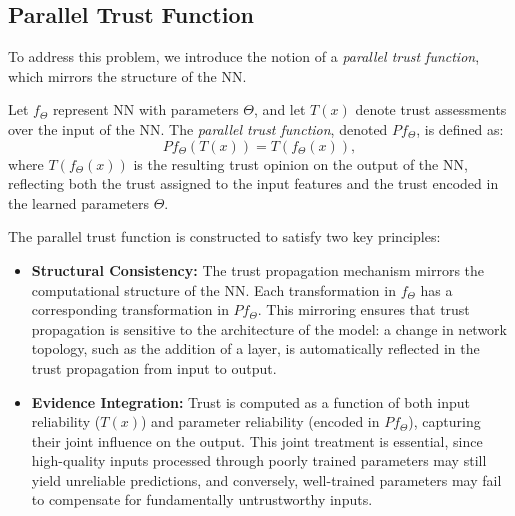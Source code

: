 \subsection{Parallel Trust Function}
To address this problem, we introduce the notion of a \emph{parallel trust function}, which mirrors the structure of the \ac{NN}.

\begin{definition}
Let $f_\Theta$ represent \ac{NN} with parameters $\Theta$, and let $T(x)$ denote trust assessments over the input of the \ac{NN}. The \emph{parallel trust function}, denoted $Pf_\Theta$, is defined as:
\[
Pf_\Theta(T(x)) = T(f_\Theta(x)),
\]
where $T(f_\Theta(x))$ is the resulting trust opinion on the output of the \ac{NN}, reflecting both the trust assigned to the input features and the trust encoded in the learned parameters $\Theta$.
\end{definition}

The parallel trust function is constructed to satisfy two key principles:
\begin{itemize}
    \item \textbf{Structural Consistency:} The trust propagation mechanism mirrors the computational structure of the \ac{NN}. Each transformation in $f_\Theta$ has a corresponding transformation in $Pf_\Theta$. This mirroring ensures that trust propagation is sensitive to the architecture of the model: a change in network topology, such as the addition of a layer, is automatically reflected in the trust propagation from input to output.
    
    \item \textbf{Evidence Integration:} Trust is computed as a function of both input reliability ($T(x)$) and parameter reliability (encoded in $Pf_\Theta$), capturing their joint influence on the output. This joint treatment is essential, since high-quality inputs processed through poorly trained parameters may still yield unreliable predictions, and conversely, well-trained parameters may fail to compensate for fundamentally untrustworthy inputs.
    
\end{itemize}


